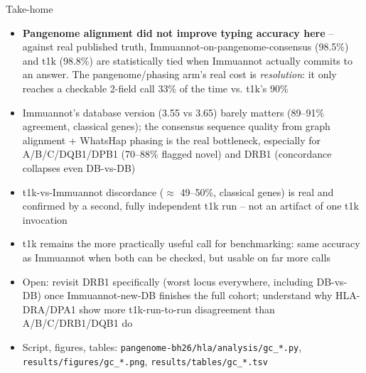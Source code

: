 \documentclass[aspectratio=169,11pt]{beamer}
\begin{document}
\begin{frame}{Take-home}
  \begin{itemize}\small
    \item \textbf{Pangenome alignment did not improve typing accuracy here} -- against real published truth, Immuannot-on-pangenome-consensus (98.5\%) and t1k (98.8\%) are statistically tied when Immuannot actually commits to an answer. The pangenome/phasing arm's real cost is \emph{resolution}: it only reaches a checkable 2-field call 33\% of the time vs. t1k's 90\%
    \item Immuannot's database version (3.55 vs 3.65) barely matters (89--91\% agreement, classical genes); the consensus sequence quality from graph alignment + WhatsHap phasing is the real bottleneck, especially for A/B/C/DQB1/DPB1 (70--88\% flagged novel) and DRB1 (concordance collapses even DB-vs-DB)
    \item t1k-vs-Immuannot discordance ($\approx$ 49--50\%, classical genes) is real and confirmed by a second, fully independent t1k run -- not an artifact of one t1k invocation
    \item t1k remains the more practically useful call for benchmarking: same accuracy as Immuannot when both can be checked, but usable on far more calls
    \item Open: revisit DRB1 specifically (worst locus everywhere, including DB-vs-DB) once Immuannot-new-DB finishes the full cohort; understand why HLA-DRA/DPA1 show more t1k-run-to-run disagreement than A/B/C/DRB1/DQB1 do
    \item Script, figures, tables: \texttt{pangenome-bh26/hla/analysis/gc\_*.py}, \texttt{results/figures/gc\_*.png}, \texttt{results/tables/gc\_*.tsv}
  \end{itemize}
\end{frame}
\end{document}
